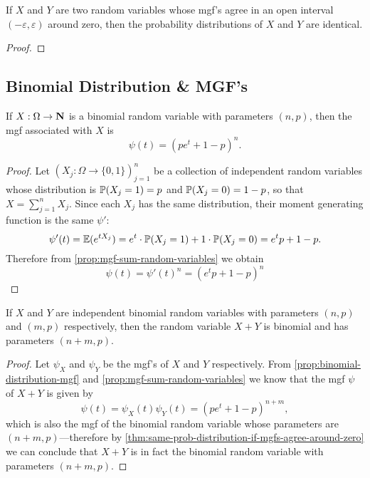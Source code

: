 \begin{theorem}
    \label{thm:same-prob-distribution-if-mgfs-agree-around-zero}
    If \(X\) and \(Y\) are two random variables whose mgf's agree in an open
    interval \((-\varepsilon, \varepsilon)\) around zero, then the probability distributions of \(X\) and
    \(Y\) are identical.
\end{theorem}

\begin{proof}
\end{proof}

\subsection{Binomial Distribution \& MGF's}

\begin{proposition}
    \label{prop:binomial-distribution-mgf}
    If \(X: \Omega \to \mathbf{N}\) is a binomial random variable with parameters
    \((n, p)\), then the mgf associated with \(X\) is
    \[
        \psi(t) = (p e^t + 1 - p)^n.
    \]
\end{proposition}

\begin{proof}
    Let \((X_j: \Omega \to \{0, 1\})_{j=1}^n\) be a collection of independent random
    variables whose distribution is \(\operatorname{\mathbb{P}}(X_j = 1) = p\) and
    \(\operatorname{\mathbb{P}}(X_j = 0) = 1 - p\), so that \(X = \sum_{j=1}^n X_j\). Since each \(X_j\)
    has the same distribution, their moment generating function is the same \(\psi'\):
    \[
        \psi'(t)
        = \operatorname{\mathbb{E}}(e^{t X_j})
        = e^t \cdot \operatorname{\mathbb{P}}(X_j = 1) + 1 \cdot \operatorname{\mathbb{P}}(X_j = 0)
        = e^t p + 1 - p.
    \]
    Therefore from \cref{prop:mgf-sum-random-variables} we obtain
    \[
        \psi(t) = \psi'(t)^n = (e^t p + 1 - p)^n
    \]
\end{proof}

\begin{theorem}
    \label{thm:additivity-binomial-random-variables}
    If \(X\) and \(Y\) are independent binomial random variables with parameters
    \((n, p)\) and \((m, p)\) respectively, then the random variable \(X + Y\) is
    binomial and has parameters \((n + m, p)\).
\end{theorem}

\begin{proof}
    Let \(\psi_X\) and \(\psi_Y\) be the mgf's of \(X\) and \(Y\) respectively. From
    \cref{prop:binomial-distribution-mgf} and \cref{prop:mgf-sum-random-variables} we
    know that the mgf \(\psi\) of \(X + Y\) is given by
    \[
        \psi(t) = \psi_X(t) \psi_Y(t) = (p e^t + 1 - p)^{n+m},
    \]
    which is also the mgf of the binomial random variable whose parameters are
    \((n+m, p)\)---therefore by
    \cref{thm:same-prob-distribution-if-mgfs-agree-around-zero} we can conclude that
    \(X + Y\) is in fact the binomial random variable with parameters \((n+m, p)\).
\end{proof}

